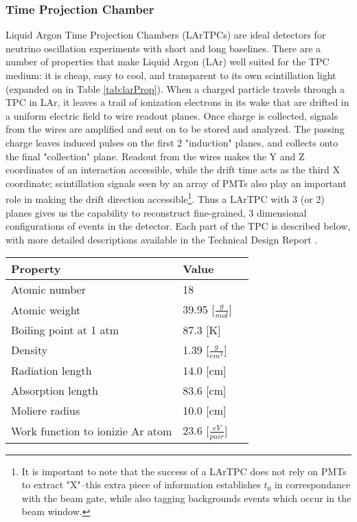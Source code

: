 \documentclass[12pt]{article}
\begin{document}
\subsubsection{Time Projection Chamber} 
\par Liquid Argon Time Projection Chambers (LArTPCs) are ideal detectors for neutrino oscillation experiments with short and long baselines.  There are a number of properties that make Liquid Argon (LAr) well suited for the TPC medium: it is cheap, easy to cool, and transparent to its own scintillation light (expanded on in Table \ref{tab:larProp}).  When a charged particle travels through a TPC in LAr, it leaves a trail of ionization electrons in its wake that are drifted in a uniform electric field to wire readout planes. Once charge is collected, signals from the wires are amplified and sent on to be stored and analyzed. The passing charge leaves induced pulses on the first 2 "induction" planes, and collects onto the final "collection" plane. Readout from the wires makes the Y and Z coordinates of an interaction accessible, while the drift time acts as the third X coordinate; scintillation signals seen by an array of PMTs also play an important role in making the drift direction accessible\footnote{It is important to note that the success of a LArTPC does not rely on PMTs to extract "X"--this extra piece of information establishes $t_0$ in correspondance with the beam gate, while also tagging backgrounds events which occur in the beam window.}.  Thus a LArTPC with 3 (or 2) planes gives us the capability to reconstruct fine-grained, 3 dimensional configurations of events in the detector. Each part of the TPC is described below, with more detailed descriptions available in the Technical Design Report \cite{bib:tdr}.


\begin{minipage}{\linewidth}
\centering
{} 
 \begin{tabular}{| l | l | l |}
 \hline
 Property & Value \\ [0.1ex] \hline \hline 
 Atomic number & 18 \\ \hline
 Atomic weight & 39.95 [$\frac{g}{mol}$] \\ \hline
 Boiling point at 1 atm & 87.3 [K] \\ \hline
 Density & 1.39 [$\frac{g}{cm^3}$] \\ \hline
 Radiation length & 14.0 [cm] \\ \hline
Absorption length & 83.6 [cm] \\ \hline
 Moliere radius & 10.0 [cm] \\ \hline 
 Work function to ionizie Ar atom  & 23.6 [$\frac{eV}{pair}$] \\
\hline
\end{tabular}
\end{minipage}
\end{document}
